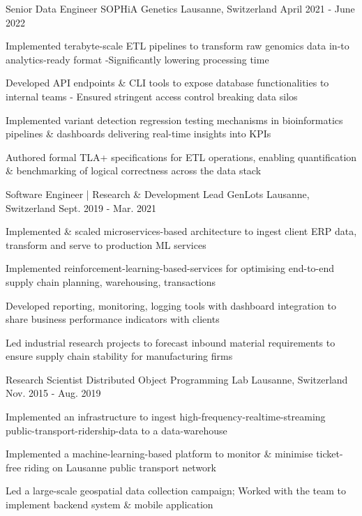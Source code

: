 \begin{cventries}
	
 \cventry
    {Senior Data Engineer} %
    {SOPHiA Genetics} %
    {Lausanne, Switzerland} %
    {April 2021 - June 2022} %
    {
      \begin{cvitems} %
        \item {Implemented terabyte-scale ETL pipelines to transform raw genomics data in-to analytics-ready format -Significantly lowering processing time}
        \item {Developed API endpoints \& CLI tools to expose database functionalities to internal teams - Ensured stringent access control breaking data silos}
        \item {Implemented variant detection regression testing mechanisms in bioinformatics pipelines \& dashboards delivering real-time insights into KPIs}
        \item {Authored formal TLA+ specifications for ETL operations, enabling quantification \& benchmarking of logical correctness across the data stack}
      \end{cvitems}
    }

  \cventry
    {Software Engineer | Research \& Development Lead} %
    {GenLots} %
    {Lausanne, Switzerland} %
    {Sept. 2019 - Mar. 2021} %
    {
      \begin{cvitems} %
        \item {Implemented \& scaled microservices-based architecture to ingest client ERP data, transform and serve to production ML services}
      	\item {Implemented reinforcement-learning-based-services for optimising end-to-end supply chain planning, warehousing, transactions}
        \item {Developed reporting, monitoring, logging tools with dashboard integration to share business performance indicators with clients}
        \item {Led industrial research projects to forecast inbound material requirements to ensure supply chain stability for manufacturing firms}
      \end{cvitems}
    } 
   

  \cventry
    {Research Scientist} %
    {Distributed Object Programming Lab} %
    {Lausanne, Switzerland} %
    {Nov. 2015 - Aug. 2019} %
    {
      \begin{cvitems} %
      	\item {Implemented an infrastructure to ingest high-frequency-realtime-streaming public-transport-ridership-data to a data-warehouse}
      	\item {Implemented a machine-learning-based platform to monitor \& minimise ticket-free riding on Lausanne public transport network}
        \item {Led a large-scale geospatial data collection campaign; Worked with the team to implement backend system \& mobile application}
      \end{cvitems}
    }



\end{cventries}
